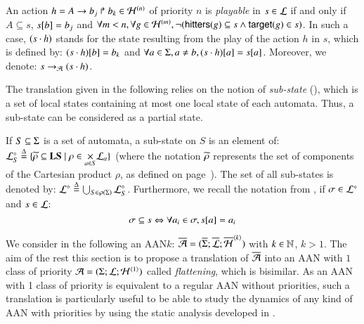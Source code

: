 \begin{definition}
\label{def:playp}
  An action $h = \PHhit{A}{b_j}{b_k} \in \PHa^{(n)}$ of priority $n$
  is \emph{playable} in $s \in \PHl$
  if and only if $A \subseteq s$, $\PHget{s}{b} = b_j$ and
  $\forall m < n, \forall g \in \PHa^{(m)},
    \neg (\PHhitter(g) \subseteq s \wedge \PHtarget(g) \in s)$.
  In such a case, $(s \PHplay h)$ stands for the state resulting from the play
  of the action $h$ in $s$, which is defined by: 
    $\PHget{(s \PHplay h)}{b} = b_k$
  and
    $\forall a \in \PHs, a \neq b, \PHget{(s\PHplay h)}{a} = \PHget{s}{a}$.
  Moreover, we denote: $s \PHPtrans (s \PHplay h)$.
\end{definition}

The translation given in the following relies on the notion of \emph{sub-state}
(),
which is a set of local states containing at most one local state of each automata.
Thus, a sub-state can be considered as a partial state.

\begin{definition}
\label{def:substate}
  If $S \subseteq \PHs$ is a set of automata, a sub-state on $S$ is an element of:
  $\PHsubl[\PHl]_S \DEF \{ \toset{\rho} \subseteq \Proc \mid
    \rho \in \bigtimes{a \in S} \PHl_a \}$
  (where the notation $\toset{\rho}$ represents
  the set of components of the Cartesian product $\rho$,
  as defined on page~\pageref{notations}).
  The set of all sub-states is denoted by:
  $\PHsubl[\PHl] \DEF \bigcup_{S \in \powerset(\PHs)} \PHsubl[\PHl]_S$.
  Furthermore, we recall the notation from ,
  if $\mysigma \in \PHsubl[\PHl]$ and $s \in \PHl$:
    \[\mysigma \subseteq s \Leftrightarrow \forall a_i \in \mysigma, \PHget{s}{a} = a_i\]
\end{definition}

We consider in the following an AAN$k$:
$\ov{\PH} = (\ov{\PHs}; \ov{\PHl}; \ov{\PHa}^{\angles{k}})$
with $k \in \sN$, $k > 1$.
The aim of the rest this section is to propose a translation of $\oPH$
into an AAN with $1$ class of priority $\PH = (\PHs; \PHl; \PHa^{\angles{1}})$
called \emph{flattening}, which is bisimilar.
As an AAN with 1 class of priority is equivalent to a regular AAN without priorities,
such a translation is particularly useful to be able to study the dynamics of
any kind of AAN with priorities by using the static analysis developed in .

